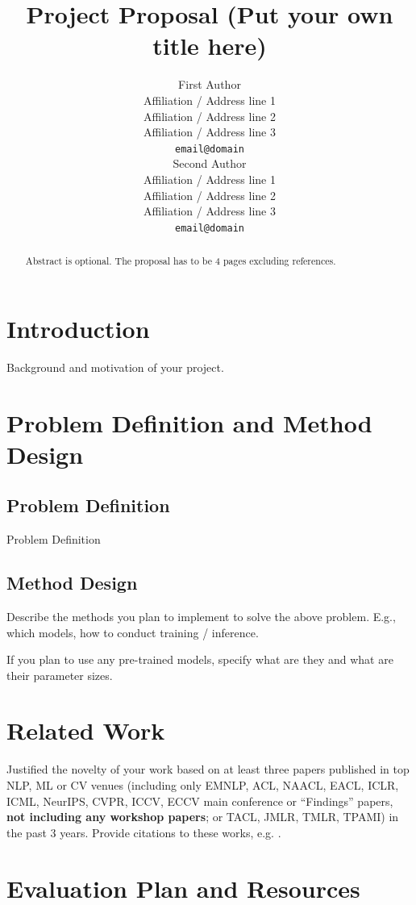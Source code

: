 \documentclass[11pt]{article}
\title{Project Proposal (Put your own title here)}
\author{First Author \\
  Affiliation / Address line 1 \\
  Affiliation / Address line 2 \\
  Affiliation / Address line 3 \\
  \texttt{email@domain} \\\And
  Second Author \\
  Affiliation / Address line 1 \\
  Affiliation / Address line 2 \\
  Affiliation / Address line 3 \\
  \texttt{email@domain} \\}
\begin{document}
\maketitle
\begin{abstract}
Abstract is optional. The proposal has to be 4 pages excluding references.
\end{abstract}

\section{Introduction}

Background and motivation of your project.

\section{Problem Definition and Method Design}

\subsection{Problem Definition}
Problem Definition

\subsection{Method Design}
Describe the methods you plan to implement to solve the above problem. E.g., which models, how to conduct training / inference.

If you plan to use any pre-trained models, specify what are they and what are their parameter sizes.


\section{Related Work}

Justified the novelty of your work based on at least three papers published in top NLP, ML or CV venues (including only EMNLP, ACL, NAACL, EACL, ICLR, ICML, NeurIPS, CVPR, ICCV, ECCV main conference or ``Findings'' papers, \textbf{not including any workshop papers}; or TACL, JMLR, TMLR, TPAMI) in the past 3 years.
Provide citations to these works, e.g. \cite{zhou-etal-2023-continual}.

\section{Evaluation Plan and Resources}
\end{document}
